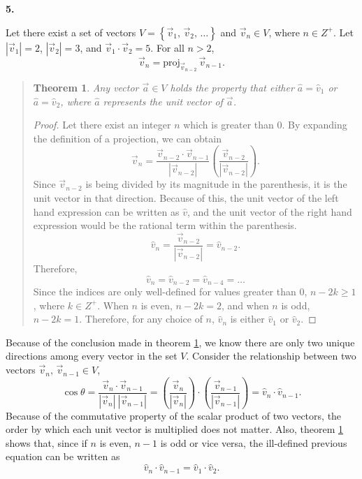 \documentclass{article}
\newcommand{\qnumber}[1]{
\vspace{0.5cm}
\noindent
\textbf{#1.}
\vspace{4mm}
}
\newtheorem{theorem}{Theorem}
\begin{document}
\qnumber{5}

Let there exist a set of vectors $V=\left\{ \vec{v}_1,\,\vec{v}_2,\,\dots \right\}$ and $\vec{v}_n\in V$, where $n\in Z^+$. Let $|\vec{v}_1|=2$, $|\vec{v}_2|=3$, and $\vec{v}_1\cdot\vec{v}_2=5$. For all $n>2$,
\begin{equation} \label{eq:set_def}
    \vec{v}_n=\text{proj}_{\vec{v}_{n-2}}\,\vec{v}_{n-1}.
\end{equation}

\begin{quote}
\begin{theorem} \label{thm:first}
Any vector $\vec{a}\in V$ holds the property that either $\hat{a}=\hat{v}_1$ or $\hat{a}=\hat{v}_2$, where $\hat{a}$ represents the unit vector of $\vec{a}$.
\end{theorem}

\begin{proof}
Let there exist an integer $n$ which is greater than 0. By expanding the definition of a projection, we can obtain
\[
    \vec{v}_n=\frac{\vec{v}_{n-2}\cdot\vec{v}_{n-1}}{|\vec{v}_{n-2}|}\left(\frac{\vec{v}_{n-2}}{|\vec{v}_{n-2}|}\right).
\]
Since $\vec{v}_{n-2}$ is being divided by its magnitude in the parenthesis, it is the unit vector in that direction. Because of this, the unit vector of the left hand expression can be written as $\hat{v}$, and the unit vector of the right hand expression would be the rational term within the parenthesis.
\[
    \hat{v}_n=\frac{\vec{v}_{n-2}}{|\vec{v}_{n-2}|}=\hat{v}_{n-2}.
\]
Therefore,
\[
    \hat{v}_n=\hat{v}_{n-2}=\hat{v}_{n-4}=\dots
\]
Since the indices are only well-defined for values greater than $0$, $n-2k\geq1$, where $k\in Z^+$. When $n$ is even, $n-2k=2$, and when $n$ is odd, $n-2k=1$. Therefore, for any choice of $n$, $\hat{v}_n$ is either $\hat{v}_1$ or $\hat{v}_2$.

\end{proof}
\end{quote}

Because of the conclusion made in theorem \ref{thm:first}, we know there are only two unique directions among every vector in the set $V$. Consider the relationship between two vectors $\vec{v}_n,\, \vec{v}_{n-1} \in V$,
\begin{equation} \label{eq:cos}
    \cos\theta = \frac{ \vec{v}_n \cdot \vec{v}_{n-1} }{ |\vec{v}_n|\:|\vec{v}_{n-1}| } = \left(\frac{\vec{v}_n}{|\vec{v}_n|}\right) \cdot \left(\frac{\vec{v}_{n-1}}{|\vec{v}_{n-1}|}\right)=\hat{v}_n \cdot \hat{v}_{n-1}.
\end{equation}
Because of the commutative property of the scalar product of two vectors, the order by which each unit vector is multiplied does not matter. Also, theorem \ref{thm:first} shows that, since if $n$ is even, $n-1$ is odd or vice versa, the ill-defined previous equation can be written as
\begin{equation} \label{eq:dotprod1}
    \hat{v}_n \cdot \hat{v}_{n-1} = \hat{v}_1 \cdot \hat{v}_2.
\end{equation}
\end{document}
